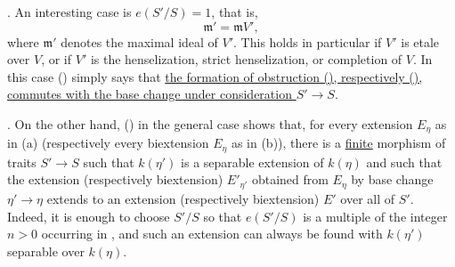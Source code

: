 \smallskip
\noindent {}.  An interesting case is $e(S'/S)=1$, that is,
\[
 \mathfrak m'=\mathfrak m V',
\]
where $\mathfrak m'$ denotes the maximal ideal of $V'$.  This holds in
particular if $V'$ is etale over $V$, or if $V'$ is the henselization,
strict henselization, or completion of $V$.  In this case () simply
says that \underline{the formation of obstruction (), respectively
(), commutes with the base change under consideration $S'\to S$}.

\smallskip
\noindent {}.  On the other hand, () in the general case shows
that, for every extension $E_\eta$ as in (a) (respectively every
biextension $E_\eta$ as in (b)), there is a \underline{finite} morphism
of traits $S'\to S$ such that $k(\eta')$ is a separable extension of
$k(\eta)$ and such that the extension (respectively biextension)
$E'_{\eta'}$ obtained from $E_\eta$ by base change $\eta'\to\eta$ extends
to an extension (respectively biextension) $E'$ over all of $S'$.  Indeed,
it is enough to choose $S'/S$ so that $e(S'/S)$ is a multiple of the
integer $n>0$ occurring in , and such an extension can always be found
with $k(\eta')$ separable over $k(\eta)$.

